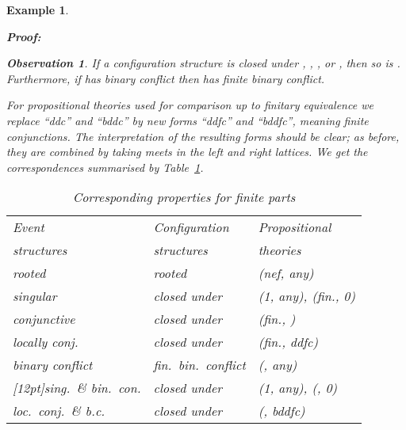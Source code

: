 \documentclass[twocolumn]{article}
\newtheorem{obs}{Observation}[section]
\newtheorem{exam}{Example}
\newenvironment{observation}[1]{\begin{obs} \rm \label{obs-#1} }{\end{obs}}
\newenvironment{example}[1]{\begin{exam} \rm \label{ex-#1} }{\end{exam}}
\newenvironment{proof}{\begin{trivlist} \item[\hspace{\labelsep}\bf
Proof:]}{\hfill \end{trivlist}}
\begin{document}
\begin{example}{causality}
\begin{proof}
\begin{observation}{finitary closure conditions}
If a configuration structure  is closed under ,
, ,  or , then so is .
Furthermore, if  has binary conflict then  has finite
binary conflict.
\end{observation}
For propositional theories used for comparison up to finitary equivalence
we replace ``ddc'' and ``bddc'' by new forms ``ddfc''  and ``bddfc'', meaning
\emph{finite} conjunctions. The interpretation of the resulting forms  
should be clear; as before, 
they are combined by taking meets in the left and right lattices.
We get the correspondences summarised by Table~\ref{correspondence_finite}.
\begin{table}[htb]
\begin{tabular}{@{}|@{~}l@{\,}|@{~}l@{~}|@{~}l@{~}|@{}}
\hline
Event           & Configuration                 & Propositional         \\
structures      & structures                    & theories              \\
\hline\hline
rooted          & rooted                        & (nef, any)            \\
singular        & closed under     & (1, any), (fin., 0)   \\
conjunctive     & closed under            & (fin., )     \\
locally conj.   & closed under      & (fin., ddfc)          \\
binary conflict & fin.\ bin.\ conflict          & (, any)      \\
\hline
\raisebox{0pt}[12pt]{sing}.\ \& bin.\ con.& closed under   & (1, any), (, 0)\\
loc.\ conj.\ \& b.c.& closed under & (, bddfc)      \\
\hline
\end{tabular}
\caption{Corresponding properties for finite parts \label{correspondence_finite}}
\end{table}


\end{proof}
\end{example}
\end{document}

